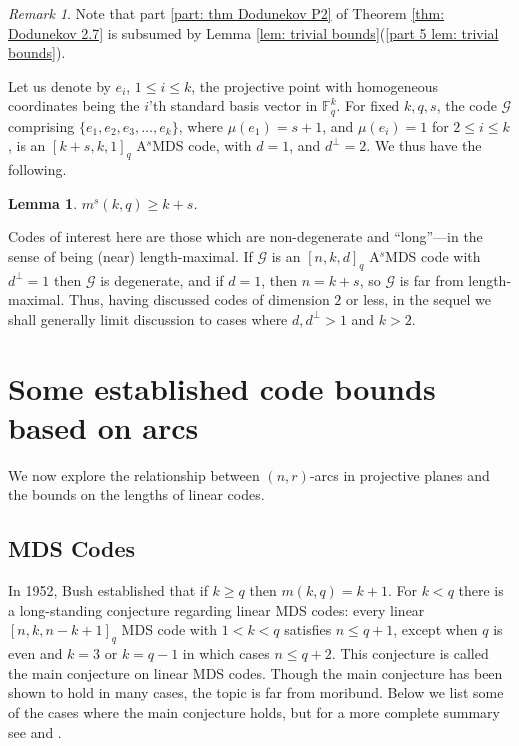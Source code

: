 \documentclass[11pt,a4paper]{amsart}
\newcommand{\AS}{ A$^s$MDS }
\newcommand{\F}{\mathbb{F}}
\newcommand{\G}{\mathcal{G}}
\theoremstyle{plain}
\newtheorem{lemma}[theorem]{Lemma}
\theoremstyle{definition}
\theoremstyle{remark}
\newtheorem{remark}[theorem]{Remark}
\begin{document}
	\begin{remark}
		Note that part  \ref{part: thm Dodunekov P2} of Theorem \ref{thm: Dodunekov 2.7}   is subsumed by Lemma \ref{lem: trivial bounds}(\ref{part 5 lem: trivial bounds}).
	\end{remark}

	Let us denote by $e_i$, $1\le i \le k$, the projective point with homogeneous coordinates being the $i$'th standard basis vector in $\F_q^k$.  For fixed $k,q,s$, the code $\G$ comprising $ \{e_1,e_2,e_3,\ldots,e_k\}$, where  $\mu(e_1)=s+1$, and $\mu(e_i)=1$ for $2\le i \le k$, is an $[k+s,k,1]_q$ \AS code, with $d=1$, and $d^\perp=2$. We thus have the following.
	\begin{lemma}
		$m^s(k,q)\ge k+s$.
	\end{lemma}

	Codes of interest here are those which are non-degenerate and ``long''---in the sense of being (near) length-maximal. If $\G$ is an $[n,k,d]_q$ \AS code with $d^\perp=1$ then $\G$ is degenerate, and if $d=1$, then $n=k+s$, so $\G$ is far from length-maximal.   Thus, having discussed codes of dimension $2$ or less, in the sequel we shall generally limit discussion to cases  where $d,d^\perp>1$ and $k>2$.

	\section{Some established code bounds based on arcs}

	We now explore the relationship between $(n,r)$-arcs in projective planes and the bounds on the lengths of linear codes.

	\subsection{MDS Codes} \label{subsec: MDS Codes}

	In 1952,  Bush \cite{Bush1952} established that if $k\ge q$ then $m(k,q) = k+1$. For $k<q$ there is a long-standing conjecture regarding linear MDS codes: every linear $[n,k,n-k+1]_q$ MDS code  with $1 < k < q$ satisfies $n \le q + 1$, except when $q$ is even and $k = 3$ or $k = q - 1$ in which cases $n \le q + 2$. This conjecture is called the main conjecture on linear MDS codes. Though the main conjecture has been shown to hold in many cases, the topic is far from moribund. Below we list some of the cases where the main conjecture holds, but for a more complete summary see \cite{MR2061806} and \cite{Ball2012}.
\end{document}
